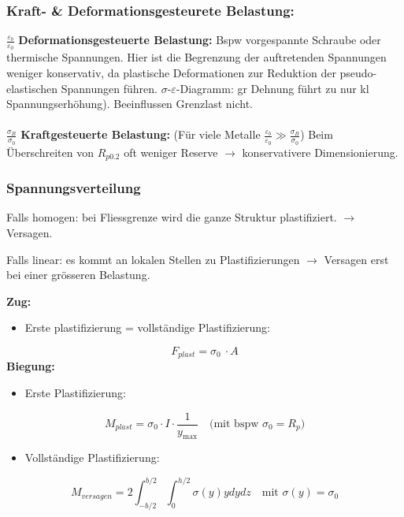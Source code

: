             \subsubsection{Kraft- \& Deformationsgesteurete Belastung:}
            $\frac{\varepsilon_b}{\varepsilon_0}$ \textbf{Deformationsgesteuerte Belastung:} Bspw vorgespannte Schraube oder thermische Spannungen. Hier ist die Begrenzung der auftretenden Spannungen weniger konservativ, da plastische Deformationen zur Reduktion der pseudo-elastischen Spannungen führen. $\sigma$-$\varepsilon$-Diagramm: gr Dehnung führt zu nur kl Spannungserhöhung). Beeinflussen Grenzlast nicht.\\\\ 
            $\frac{\sigma_B}{\sigma_0}$ \textbf{Kraftgesteuerte Belastung:} (Für viele Metalle $\frac{\varepsilon_b}{\varepsilon_0} \gg \frac{\sigma_B}{\sigma_0}$) Beim Überschreiten von $R_{p0.2}$ oft weniger Reserve $\rightarrow$ konservativere Dimensionierung.
        
        \subsubsection{Spannungsverteilung}
            Falls homogen: bei Fliessgrenze wird die ganze Struktur plastifiziert. $\rightarrow$ Versagen. 
              
            Falls linear: es kommt an lokalen Stellen zu Plastifizierungen $\rightarrow$ Versagen erst bei einer grösseren Belastung.
            
            \textbf{Zug:}
            \begin{itemize}
                \item Erste plastifizierung = vollständige Plastifizierung:
            \end{itemize}
            \[\displaystyle F_{plast} = \sigma_0\ \cdot A\]
            \textbf{Biegung:}
            \begin{itemize}
                \item Erste Plastifizierung:
            \end{itemize}
            \[M_{plast} = \sigma_0\cdot I\cdot\frac{1}{y_{\textrm{max}}} \quad\textrm{(mit bspw $\sigma_0 = R_p$)}\]
            \begin{itemize}
                \item Vollständige Plastifizierung:
            \end{itemize}
            \[M_{versagen} = 2\int_{-b/2}^{b/2}\int_{0}^{h/2}\sigma(y)ydydz \quad\textrm{mit $\sigma(y) = \sigma_0$}\]
            
